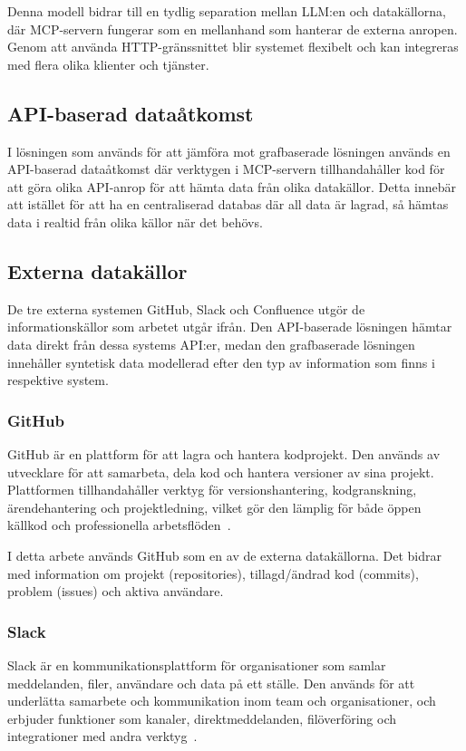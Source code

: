 Denna modell bidrar till en tydlig separation mellan LLM:en och datakällorna, där MCP-servern fungerar som en mellanhand som hanterar de externa anropen.
Genom att använda HTTP-gränssnittet blir systemet flexibelt och kan integreras med flera olika klienter och tjänster.

\subsection{API-baserad dataåtkomst}\label{subsec:api}
I lösningen som används för att jämföra mot grafbaserade lösningen används en API-baserad dataåtkomst där verktygen i MCP-servern tillhandahåller kod för att göra olika API-anrop för att hämta data från olika datakällor.
Detta innebär att istället för att ha en centraliserad databas där all data är lagrad, så hämtas data i realtid från olika källor när det behövs.

\subsection{Externa datakällor}\label{subsec:external_sources}
De tre externa systemen GitHub, Slack och Confluence utgör de informationskällor som arbetet utgår ifrån.
Den API-baserade lösningen hämtar data direkt från dessa systems API:er, medan den grafbaserade lösningen innehåller syntetisk
  data modellerad efter den typ av information som finns i respektive system.

\subsubsection{GitHub}\label{subsubsec:github}
GitHub är en plattform för att lagra och hantera kodprojekt.
Den används av utvecklare för att samarbeta, dela kod och hantera versioner av sina projekt.
Plattformen tillhandahåller verktyg för versionshantering, kodgranskning, ärendehantering och projektledning, vilket gör den lämplig för både öppen källkod och professionella arbetsflöden~\cite{github}.

I detta arbete används GitHub som en av de externa datakällorna.
Det bidrar med information om projekt (repositories), tillagd/ändrad kod (commits), problem (issues) och aktiva användare.

\subsubsection{Slack}\label{subsubsec:slack}
Slack är en kommunikationsplattform för organisationer som samlar meddelanden, filer, användare och data på ett ställe.
Den används för att underlätta samarbete och kommunikation inom team och organisationer, och erbjuder funktioner som kanaler, direktmeddelanden, filöverföring och integrationer med andra verktyg~\cite{slack}.

